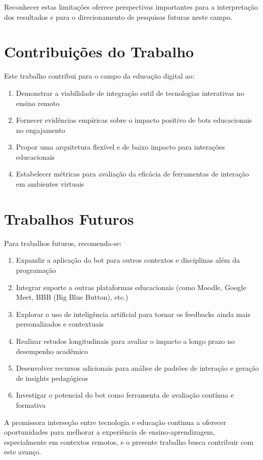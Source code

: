 Reconhecer estas limitações oferece perspectivas importantes para a interpretação dos resultados e para o direcionamento de pesquisas futuras neste campo.


\section{Contribuições do Trabalho}
\label{sec:contribuicoes}

Este trabalho contribui para o campo da educação digital ao:

\begin{enumerate}
\item Demonstrar a viabilidade de integração sutil de tecnologias interativas no ensino remoto
\item Fornecer evidências empíricas sobre o impacto positivo de bots educacionais no engajamento
\item Propor uma arquitetura flexível e de baixo impacto para interações educacionais
\item Estabelecer métricas para avaliação da eficácia de ferramentas de interação em ambientes virtuais
\end{enumerate}


\section{Trabalhos Futuros}
\label{sec:trabalhos-futuros}

Para trabalhos futuros, recomenda-se:

\begin{enumerate}
\item Expandir a aplicação do bot para outros contextos e disciplinas além da programação
\item Integrar suporte a outras plataformas educacionais (como Moodle, Google Meet, BBB (Big Blue Button), etc.)
\item Explorar o uso de inteligência artificial para tornar os feedbacks ainda mais personalizados e contextuais
\item Realizar estudos longitudinais para avaliar o impacto a longo prazo no desempenho acadêmico
\item Desenvolver recursos adicionais para análise de padrões de interação e geração de insights pedagógicos
\item Investigar o potencial do bot como ferramenta de avaliação contínua e formativa
\end{enumerate}

A promissora interseção entre tecnologia e educação continua a oferecer oportunidades para melhorar a experiência de ensino-aprendizagem, especialmente em contextos remotos, e o presente trabalho busca contribuir com este avanço.
